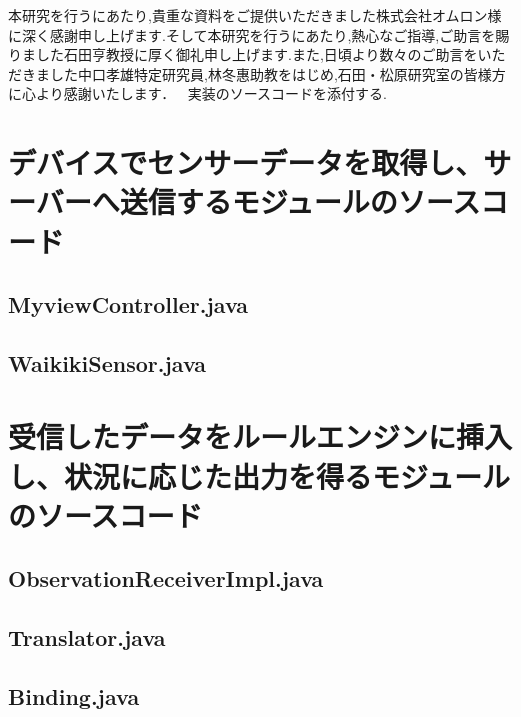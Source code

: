 \documentclass{kuisthesis}			%
\begin{document}
\acknowledgments				%
本研究を行うにあたり,貴重な資料をご提供いただきました株式会社オムロン様に深く感謝申し上げます.そして本研究を行うにあたり,熱心なご指導,ご助言を賜りました石田亨教授に厚く御礼申し上げます.また,日頃より数々のご助言をいただきました中口孝雄特定研究員,林冬惠助教をはじめ,石田・松原研究室の皆様方に心より感謝いたします．

\nocite{*}

\Appendix[付録]
実装のソースコードを添付する.

\section{デバイスでセンサーデータを取得し、サーバーへ送信するモジュールのソースコード}
\subsection{MyviewController.java}


\subsection{WaikikiSensor.java}


\section{受信したデータをルールエンジンに挿入し、状況に応じた出力を得るモジュールのソースコード}

\subsection{ObservationReceiverImpl.java}


\subsection{Translator.java}


\subsection{Binding.java}

\end{document}
